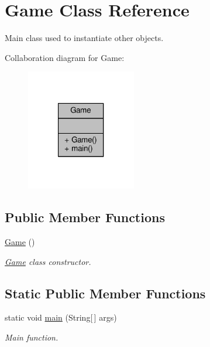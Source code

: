\hypertarget{classGame}{\section{Game Class Reference}
\label{classGame}
}


Main class used to instantiate other objects.  




Collaboration diagram for Game\-:\nopagebreak
\begin{figure}[H]
\begin{center}
\leavevmode
\includegraphics[width=136pt]{classGame__coll__graph}
\end{center}
\end{figure}
\subsection*{Public Member Functions}
\begin{DoxyCompactItemize}
\item 
\hyperlink{classGame_a2e034e53e9c032964ecd2a831b29a616}{Game} ()
\begin{DoxyCompactList}\small\item\em \hyperlink{classGame}{Game} class constructor. \end{DoxyCompactList}\end{DoxyCompactItemize}
\subsection*{Static Public Member Functions}
\begin{DoxyCompactItemize}
\item 
static void \hyperlink{classGame_ae52595a27ac1b327b05db2129ad81fca}{main} (String\mbox{[}$\,$\mbox{]} args)
\begin{DoxyCompactList}\small\item\em Main function. \end{DoxyCompactList}\end{DoxyCompactItemize}


